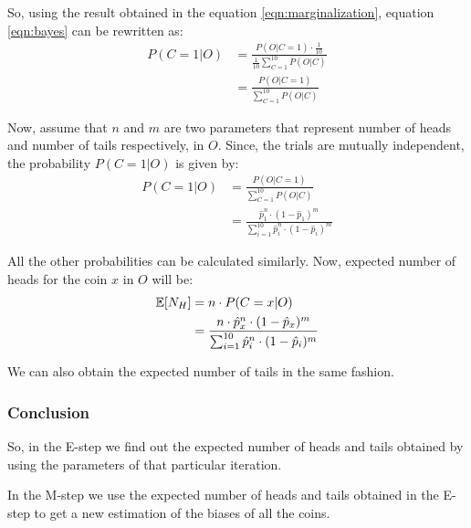 \documentclass[journal, compsoc]{IEEEtran}
\begin{document}
So, using the result obtained in the equation \ref{eqn:marginalization}, equation \ref{eqn:bayes} can be rewritten as:
\begin{equation}
\label{eqn:final}
\begin{aligned}
P(C = 1 | O) &= \frac{P(O | C = 1) \cdot \frac{1}{10}}{\frac{1}{10}\sum_{C = 1}^{10} P(O | C)}\\
&= \frac{P(O | C = 1)}{\sum_{C = 1}^{10} P(O | C)}
\end{aligned}
\end{equation}

Now, assume that $n$ and $m$ are two parameters that represent number of heads and number of tails respectively, in $O$. Since, the trials are mutually
independent, the probability $P(C = 1 | O)$ is given by:
\begin{equation}
\label{eqn:finale}
\begin{aligned}
P(C = 1 | O) &= \frac{P(O | C = 1)}{\sum_{C = 1}^{10} P(O | C)}\\
&= \frac{\hat{p}_{1}^{n}\cdot (1 - \hat{p}_{1})^{m}}{\sum_{i = 1}^{10} \hat{p}_{i}^{n}\cdot (1 - \hat{p}_{i})^{m}}
\end{aligned}
\end{equation}

All the other probabilities can be calculated similarly. Now, expected number of heads for the coin $x$ in $O$ will be:
\begin{equation}
\label{eqn:heads}
\begin{aligned}
\mathbb{E}[N_{H}] &= n \cdot P(C = x | O) \hspace{2mm}\\
&= \frac{n\cdot \hat{p}_{x}^{n}\cdot (1 - \hat{p}_{x})^{m}}{\sum_{i = 1}^{10} \hat{p}_{i}^{n}\cdot (1 - \hat{p}_{i})^{m}}
\end{aligned}
\end{equation}

We can also obtain the expected number of tails in the same fashion.

\subsubsection{Conclusion}
So, in the E-step we find out the expected number of heads and tails obtained by using the parameters of that particular iteration.

In the M-step we use the expected number of heads and tails obtained in the E-step to get a new estimation of the biases of all the coins.
\end{document}
